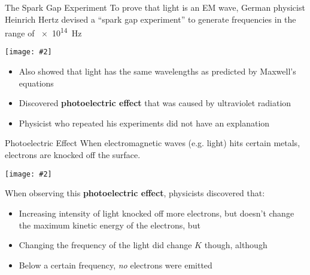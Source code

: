 \documentclass[12pt,compress,aspectratio=169]{beamer}
\newcommand{\pic}[2]{\texttt{[image: \#2]}}
\begin{document}
\begin{frame}{The Spark Gap Experiment}
  To prove that light is an EM wave, German physicist Heinrich Hertz devised a
  ``spark gap experiment'' to generate frequencies in the range of
  \SI{e14}{\hertz}
  \begin{center}
    \pic{.55}{Hertz_exp_2}
  \end{center}
  \begin{itemize}
  \item\vspace{-.1in}Also showed that light has the same wavelengths as
    predicted by Maxwell's equations
  \item Discovered \textbf{photoelectric effect} that was caused by ultraviolet
    radiation
  \item Physicist who repeated his experiments did not have an explanation
  \end{itemize}
\end{frame}


\begin{frame}{Photoelectric Effect}
  When electromagnetic waves (e.g. light) hits certain metals, electrons are
  knocked off the surface.
  \begin{center}
    \pic{.9}{73bacc9f2bf571752483a89ef6c61a94f07470f7}
  \end{center}
  When observing this \textbf{photoelectric effect}, physicists discovered that:
  \begin{itemize}
  \item Increasing intensity of light knocked off more electrons, but doesn't
    change the maximum kinetic energy of the electrons, but
  \item Changing the frequency of the light did change $K$ though, although
  \item Below a certain frequency, \emph{no} electrons were emitted
  \end{itemize}
\end{frame}
\end{document}

